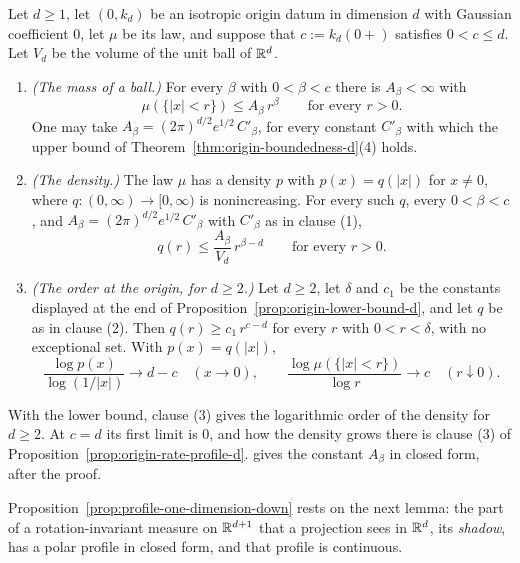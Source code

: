 \begin{proposition}\label{prop:origin-upper-bound-d}
Let $d \ge 1$, let $(0, k_d)$ be an isotropic origin datum in dimension $d$ with Gaussian
coefficient $0$, let $\mu$ be its law, and suppose that $c := k_d(0{+})$ satisfies $0 < c \le d$.
Let $V_d$ be the volume of the unit ball of $\mathbb{R}^d$.
\begin{enumerate}
\item \emph{(The mass of a ball.)} For every $\beta$ with $0 < \beta < c$ there is
$A_\beta < \infty$ with
\[
  \mu(\{|x| < r\}) \le A_\beta\,r^{\beta} \qquad\text{for every } r > 0 .
\]
One may take $A_\beta = (2\pi)^{d/2}e^{1/2}\,C'_\beta$, for every constant $C'_\beta$ with which
the upper bound of Theorem~\ref{thm:origin-boundedness-d}(4) holds.
\item \emph{(The density.)} The law $\mu$ has a density $p$ with $p(x) = q(|x|)$ for $x \ne 0$,
where $q : (0,\infty) \to [0,\infty)$ is nonincreasing. For every such $q$, every $0 < \beta < c$, and
$A_\beta = (2\pi)^{d/2}e^{1/2}\,C'_\beta$ with $C'_\beta$ as in clause (1),
\[
  q(r) \le \frac{A_\beta}{V_d}\,r^{\beta-d} \qquad\text{for every } r > 0 .
\]
\item \emph{(The order at the origin, for $d \ge 2$.)} Let $d \ge 2$, let $\delta$ and $c_1$ be
the constants displayed at the end of Proposition~\ref{prop:origin-lower-bound-d}, and let $q$ be as in
clause (2). Then
$q(r) \ge c_1\,r^{c-d}$ for every $r$ with $0 < r < \delta$, with no exceptional set. With
$p(x) = q(|x|)$,
\[
  \frac{\log p(x)}{\log(1/|x|)} \to d - c \quad (x \to 0), \qquad
  \frac{\log \mu(\{|x| < r\})}{\log r} \to c \quad (r \downarrow 0) .
\]
\end{enumerate}
\end{proposition}

With the lower bound, clause (3) gives the logarithmic order of the density for $d \ge 2$. At
$c = d$ its first limit is $0$, and how the density grows there is clause (3) of
Proposition~\ref{prop:origin-rate-profile-d}. \suppl{} gives the constant $A_\beta$ in closed
form, after the proof.

Proposition~\ref{prop:profile-one-dimension-down} rests on the next lemma: the part of a
rotation-invariant \Levy{} measure on $\mathbb{R}^{d+1}$ that a projection sees in $\mathbb{R}^d$, its
\emph{shadow}, has a polar profile in closed form, and that profile is continuous.

